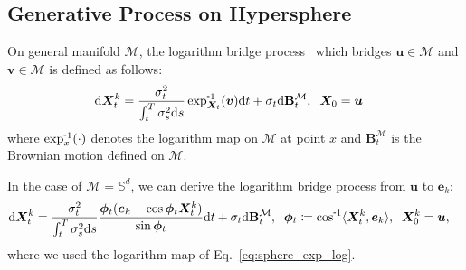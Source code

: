 \subsection{Generative Process on Hypersphere} \label{app:derivation:log}
On general manifold $\mathcal{M}$, the logarithm bridge process~\citep{jo2024riemannian} which bridges $\bm{u}\in\mathcal{M}$ and $\bm{v}\in\mathcal{M}$ is defined as follows:
\begin{align}
    \mathrm{d}\bm{X}^k_t 
    &= \frac{\sigma^2_t}{\int^T_t \sigma^2_s\mathrm{d}s} \logmap{\bm{X}_t}{\bm{v}} \mathrm{d}t + \sigma_t \mathrm{d}\mathbf{B}^{\mathcal{M}}_t, \;\; 
    \bm{X}_0 = \bm{u}
\label{eq:bridge_app}
\end{align}
where $\logmap{x}{\cdot}$ denotes the logarithm map on $\mathcal{M}$ at point $x$ and $\mathbf{B}^{\mathcal{M}}_t$ is the Brownian motion defined on $\mathcal{M}$.

In the case of $\mathcal{M}=\mathbb{S}^d$, we can derive the logarithm bridge process from $\bm{u}$ to $\bm{e}_k$:
\begin{align}
    \mathrm{d}\bm{X}^k_t 
    = \frac{\sigma^2_t}{\int^T_t \sigma^2_s\mathrm{d}s} \frac{\bm{\phi}_t(\bm{e}_k - \cos\bm{\phi}_t \bm{X}^k_t)}{\sin\bm{\phi}_t} \mathrm{d}t + \sigma_t\mathrm{d}\mathbf{B}^{\mathcal{M}}_t, \;\;
    \bm{\phi}_t &\coloneqq \invcos\langle\bm{X}^{k}_t, \bm{e}_k \rangle, \;\; 
    \bm{X}^{k}_0=\bm{u},
\label{eq:bridge_sphere_app}
\end{align}
where we used the logarithm map of Eq.~\eqref{eq:sphere_exp_log}.


